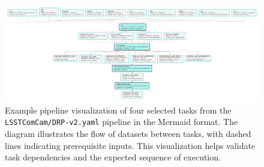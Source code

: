 \begin{figure}
    \centering
    \includegraphics[width=\textwidth]{figures/pipe_viz_comcam_subset.pdf}
    \caption{
        Example pipeline visualization of four selected tasks from the \texttt{LSSTComCam/DRP-v2.yaml} pipeline in the Mermaid format.
        The diagram illustrates the flow of datasets between tasks, with dashed lines indicating prerequisite inputs.
        This visualization helps validate task dependencies and the expected sequence of execution.
    }
    \label{fig:pipe_viz}
\end{figure}